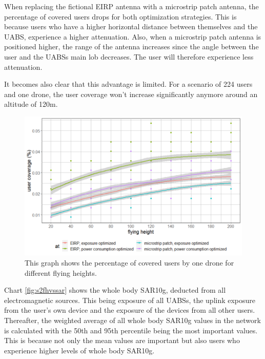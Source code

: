 When replacing the fictional \gls{EIRP} antenna with a microstrip patch antenna, the percentage of covered users drops for both 
optimization strategies. This is because users who have a higher horizontal distance between themselves and the \gls{UABS}, 
experience a higher attenuation. Also, when a microstrip patch antenna is positioned higher, the range of the antenna increases 
since the angle between the user and the \gls{UABS}s main lob decreases. The user will therefore experience less attenuation.

It becomes also clear that this advantage is limited. For a scenario of 224 users and one drone, the user coverage won’t increase
 significantly anymore around an altitude of 120m.

\begin{figure}[h!]
  \includegraphics[width=\textwidth]{../results/s2/fhvscov.png}
  \caption{This graph shows the percentage of covered users by one drone for different flying heights.}
  \label{fig:s2fhvscov}
\end{figure}

Chart \ref{fig:s2fhvssar} shows the whole body SAR10g, deducted from all electromagnetic sources. This being exposure of all \gls{UABS}s,
 the uplink exposure from the user’s own device and the exposure of the devices from all other users. 
 Thereafter, the weighted average of all whole body SAR10g values in the network is calculated with the 50th and 95th percentile 
 being the most important values. This is because not only the mean values are important but also users who experience higher 
 levels of whole body SAR10g.


